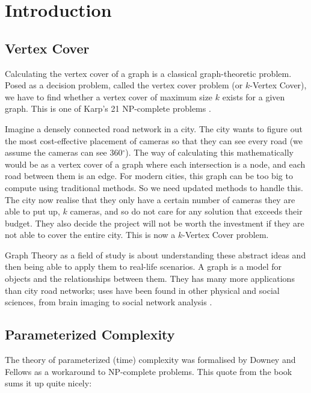 \section{Introduction}

\subsection{Vertex Cover}

Calculating the vertex cover of a graph is a classical graph-theoretic problem.
Posed as a decision problem, called the vertex cover problem (or \(k\)-Vertex
Cover), we have to find whether a vertex cover of maximum size \(k\) exists for
a given graph. This is one of Karp's 21 NP-complete problems
\cite{karp1972reducibility}.

Imagine a densely connected road network in a city. The city wants to figure
out the most cost-effective placement of cameras so that they can see every
road (we assume the cameras can see 360\(^\circ\)). The way of calculating this
mathematically would be as a vertex cover of a graph where each intersection is
a node, and each road between them is an edge. For modern cities, this graph
can be too big to compute using traditional methods. So we need updated methods
to handle this. The city now realise that they only have a certain number of
cameras they are able to put up, \(k\) cameras, and so do not care for any
solution that exceeds their budget. They also decide the project will not be
worth the investment if they are not able to cover the entire city. This is now
a \(k\)-Vertex Cover problem.

Graph Theory as a field of study is about understanding these abstract ideas
and then being able to apply them to real-life scenarios. A graph is a model
for objects and the relationships between them. They has many more applications
than city road networks; uses have been found in other physical and social
sciences, from brain imaging \cite{vecchio2016brain} to social network analysis
\cite{grandjean2016social}.

\subsection{Parameterized Complexity}

The theory of parameterized (time) complexity was formalised by Downey and
Fellows \cite{downey1999parameterized} as a workaround to NP-complete problems.
This quote from the book sums it up quite nicely:

